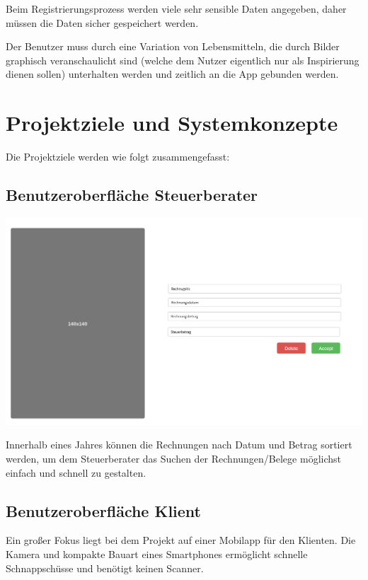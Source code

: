 \documentclass[12pt]{article}
\theoremstyle{definition}
\begin{document}
Beim Registrierungsprozess werden viele sehr sensible Daten angegeben, daher müssen die Daten sicher gespeichert werden.

Der Benutzer muss durch eine Variation von Lebensmitteln, die durch Bilder graphisch veranschaulicht sind (welche dem Nutzer eigentlich nur als Inspirierung dienen sollen) unterhalten werden und zeitlich an die App gebunden werden.


\section{Projektziele und Systemkonzepte}
Die Projektziele werden wie folgt zusammengefasst:

\subsection{Benutzeroberfläche Steuerberater}


\includegraphics[width=\linewidth]{SingleReceiptReview}

\noindent Innerhalb eines Jahres können die Rechnungen nach Datum und Betrag sortiert werden, um dem Steuerberater das Suchen der Rechnungen/Belege möglichst einfach und schnell zu gestalten.
\par

\pagebreak
\subsection{Benutzeroberfläche Klient}
Ein großer Fokus liegt bei dem Projekt auf einer Mobilapp für den Klienten. Die Kamera und kompakte Bauart eines Smartphones ermöglicht schnelle Schnappschüsse und benötigt keinen Scanner.
\end{document}
